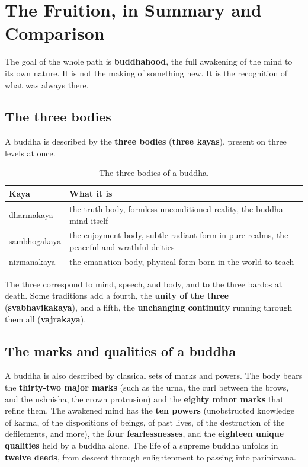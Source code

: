 \section{The Fruition, in Summary and Comparison}

The goal of the whole path is \textbf{buddhahood}, the full awakening of the mind to its own nature. It is not the making of something new. It is the recognition of what was always there.

\subsection{The three bodies}

A buddha is described by the \textbf{three bodies} (\textbf{three kayas}), present on three levels at once.

\begin{longtable}{L{3.2cm} L{8.0cm}}
\caption{The three bodies of a buddha.}\\
\toprule
\textbf{Kaya} & \textbf{What it is} \\
\midrule
dharmakaya & the truth body, formless unconditioned reality, the buddha-mind itself \\
sambhogakaya & the enjoyment body, subtle radiant form in pure realms, the peaceful and wrathful deities \\
nirmanakaya & the emanation body, physical form born in the world to teach \\
\bottomrule
\end{longtable}

The three correspond to mind, speech, and body, and to the three bardos at death. Some traditions add a fourth, the \textbf{unity of the three} (\textbf{svabhavikakaya}), and a fifth, the \textbf{unchanging continuity} running through them all (\textbf{vajrakaya}).

\subsection{The marks and qualities of a buddha}

A buddha is also described by classical sets of marks and powers. The body bears the \textbf{thirty-two major marks} (such as the urna, the curl between the brows, and the ushnisha, the crown protrusion) and the \textbf{eighty minor marks} that refine them. The awakened mind has the \textbf{ten powers} (unobstructed knowledge of karma, of the dispositions of beings, of past lives, of the destruction of the defilements, and more), the \textbf{four fearlessnesses}, and the \textbf{eighteen unique qualities} held by a buddha alone. The life of a supreme buddha unfolds in \textbf{twelve deeds}, from descent through enlightenment to passing into parinirvana.


